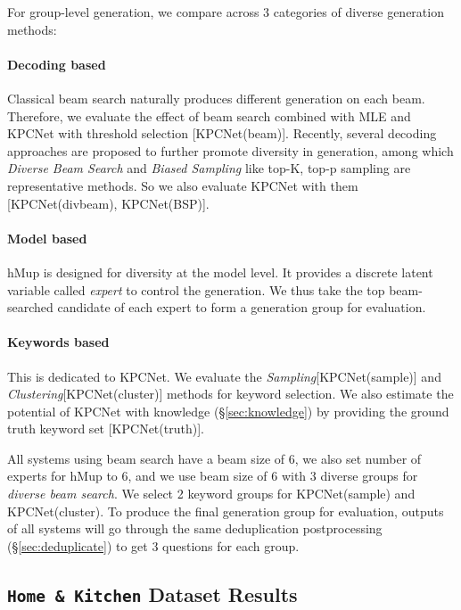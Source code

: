 \vspace{0.8em}

For group-level generation, we compare across 3 categories of diverse generation methods:
\paragraph{Decoding based} Classical beam search naturally produces different generation on each beam. Therefore, we evaluate the effect of beam search combined with MLE and KPCNet with threshold selection [KPCNet(beam)]. Recently, several decoding approaches \citep{ippolito2019comparison} are proposed to further promote diversity in generation, among which \textit{Diverse Beam Search}\citep{vijayakumar2018diverse} and \textit{Biased Sampling} like top-K, top-p sampling \citep{fan-etal-2018-hierarchical, holtzman2019curious} are representative methods. So we also evaluate KPCNet with them [KPCNet(divbeam), KPCNet(BSP)].
\paragraph{Model based} hMup is designed for diversity at the model level. It provides a discrete latent variable called \textit{expert} to control the generation. We thus take the top beam-searched candidate of each expert to form a generation group for evaluation.
\paragraph{Keywords based} This is dedicated to KPCNet. We evaluate the \textit{Sampling}[KPCNet(sample)] and \textit{Clustering}[KPCNet(cluster)] methods for keyword selection. We also estimate the potential of KPCNet with knowledge (\S \ref{sec:knowledge}) by providing the ground truth keyword set [KPCNet(truth)].

\vspace{0.8em}

All systems using beam search have a beam size of 6, we also set number of experts for hMup to 6, and we use beam size of 6 with 3 diverse groups for \textit{diverse beam search}. We select 2 keyword groups for KPCNet(sample) and KPCNet(cluster). To produce the final generation group for evaluation, outputs of all systems will go through the same deduplication postprocessing (\S \ref{sec:deduplicate}) to get 3 questions for each group.

\subsection{\texttt{Home \& Kitchen} Dataset Results}

